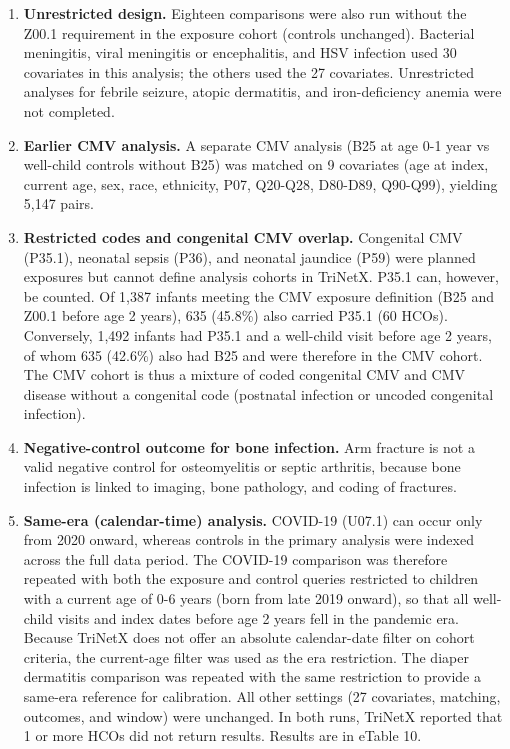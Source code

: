 \documentclass[11pt]{article}
\providecommand{\tightlist}{\setlength{\itemsep}{0pt}\setlength{\parskip}{0pt}}
\begin{document}
\begin{enumerate}
\def\labelenumi{\arabic{enumi}.}
\tightlist
\item
  \textbf{Unrestricted design.} Eighteen comparisons were
  also run without the Z00.1 requirement in the exposure
  cohort (controls unchanged). Bacterial meningitis, viral
  meningitis or encephalitis, and HSV infection used 30
  covariates in this analysis; the others used the 27
  covariates. Unrestricted analyses for febrile seizure,
  atopic dermatitis, and iron-deficiency anemia were not
  completed.
\item
  \textbf{Earlier CMV analysis.} A separate CMV analysis
  (B25 at age 0-1 year vs well-child controls without B25)
  was matched on 9 covariates (age at index, current age,
  sex, race, ethnicity, P07, Q20-Q28, D80-D89, Q90-Q99),
  yielding 5,147 pairs.
\item
  \textbf{Restricted codes and congenital CMV overlap.}
  Congenital CMV (P35.1), neonatal sepsis (P36), and
  neonatal jaundice (P59) were planned exposures but cannot
  define analysis cohorts in TriNetX. P35.1 can, however, be
  counted. Of 1,387 infants meeting the CMV exposure
  definition (B25 and Z00.1 before age 2 years), 635
  (45.8\%) also carried P35.1 (60 HCOs). Conversely, 1,492
  infants had P35.1 and a well-child visit before age 2
  years, of whom 635 (42.6\%) also had B25 and were
  therefore in the CMV cohort. The CMV cohort is thus a
  mixture of coded congenital CMV and CMV disease without a
  congenital code (postnatal infection or uncoded congenital
  infection).
\item
  \textbf{Negative-control outcome for bone infection.} Arm
  fracture is not a valid negative control for osteomyelitis
  or septic arthritis, because bone infection is linked to
  imaging, bone pathology, and coding of fractures.
\item
  \textbf{Same-era (calendar-time) analysis.} COVID-19
  (U07.1) can occur only from 2020 onward, whereas controls
  in the primary analysis were indexed across the full data
  period. The COVID-19 comparison was therefore repeated
  with both the exposure and control queries restricted to
  children with a current age of 0-6 years (born from late
  2019 onward), so that all well-child visits and index
  dates before age 2 years fell in the pandemic era. Because
  TriNetX does not offer an absolute calendar-date filter on
  cohort criteria, the current-age filter was used as the
  era restriction. The diaper dermatitis comparison was
  repeated with the same restriction to provide a same-era
  reference for calibration. All other settings (27
  covariates, matching, outcomes, and window) were
  unchanged. In both runs, TriNetX reported that 1 or more
  HCOs did not return results. Results are in eTable 10.
\end{enumerate}
\end{document}
